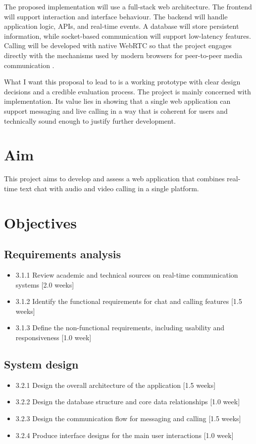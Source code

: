\documentclass[12pt,a4paper]{article}
\begin{document}
The proposed implementation will use a full-stack web architecture. The frontend will support interaction and interface behaviour. The backend will handle application logic, APIs, and real-time events. A database will store persistent information, while socket-based communication will support low-latency features. Calling will be developed with native WebRTC so that the project engages directly with the mechanisms used by modern browsers for peer-to-peer media communication \citep{alvestrand2021,webrtcw3c2025}.

What I want this proposal to lead to is a working prototype with clear design decisions and a credible evaluation process. The project is mainly concerned with implementation. Its value lies in showing that a single web application can support messaging and live calling in a way that is coherent for users and technically sound enough to justify further development.

\section{Aim}

This project aims to develop and assess a web application that combines real-time text chat with audio and video calling in a single platform.

\section{Objectives}
\subsection{Requirements analysis}
\begin{itemize}
    \item 3.1.1 Review academic and technical sources on real-time communication systems [2.0 weeks]
    \item 3.1.2 Identify the functional requirements for chat and calling features [1.5 weeks]
    \item 3.1.3 Define the non-functional requirements, including usability and responsiveness [1.0 week]
\end{itemize}

\subsection{System design}
\begin{itemize}
    \item 3.2.1 Design the overall architecture of the application [1.5 weeks]
    \item 3.2.2 Design the database structure and core data relationships [1.0 week]
    \item 3.2.3 Design the communication flow for messaging and calling [1.5 weeks]
    \item 3.2.4 Produce interface designs for the main user interactions [1.0 week]
\end{itemize}
\end{document}
